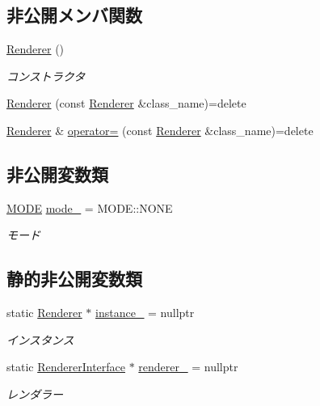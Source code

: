 \subsection*{非公開メンバ関数}
\begin{DoxyCompactItemize}
\item 
\mbox{\hyperlink{class_renderer_a7ebf46f54dab9905f79b80f7fddb76a6}{Renderer}} ()
\begin{DoxyCompactList}\small\item\em コンストラクタ \end{DoxyCompactList}\item 
\mbox{\hyperlink{class_renderer_a1e7732f4c952f3c13d9bb03a7510b7aa}{Renderer}} (const \mbox{\hyperlink{class_renderer}{Renderer}} \&class\+\_\+name)=delete
\item 
\mbox{\hyperlink{class_renderer}{Renderer}} \& \mbox{\hyperlink{class_renderer_ab80abe5f35a095f221f8c43916900d66}{operator=}} (const \mbox{\hyperlink{class_renderer}{Renderer}} \&class\+\_\+name)=delete
\end{DoxyCompactItemize}
\subsection*{非公開変数類}
\begin{DoxyCompactItemize}
\item 
\mbox{\hyperlink{class_renderer_ab5a9379ccadcf2b3394c61cf8c835fec}{M\+O\+DE}} \mbox{\hyperlink{class_renderer_adaed44b3c6c8b0879b8cd52f677941cf}{mode\+\_\+}} = M\+O\+D\+E\+::\+N\+O\+NE
\begin{DoxyCompactList}\small\item\em モード \end{DoxyCompactList}\end{DoxyCompactItemize}
\subsection*{静的非公開変数類}
\begin{DoxyCompactItemize}
\item 
static \mbox{\hyperlink{class_renderer}{Renderer}} $\ast$ \mbox{\hyperlink{class_renderer_aa0ca48ac8408e8726d5dd135432ae4fa}{instance\+\_\+}} = nullptr
\begin{DoxyCompactList}\small\item\em インスタンス \end{DoxyCompactList}\item 
static \mbox{\hyperlink{class_renderer_interface}{Renderer\+Interface}} $\ast$ \mbox{\hyperlink{class_renderer_a64d00cd885d84ff355228d884c0215dc}{renderer\+\_\+}} = nullptr
\begin{DoxyCompactList}\small\item\em レンダラー \end{DoxyCompactList}\end{DoxyCompactItemize}


